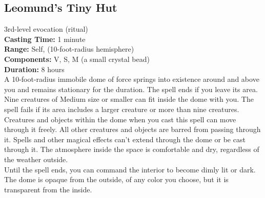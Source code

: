 \documentclass[11pt, A4paper, english]{article}
\begin{document}
		\subsection{Leomund’s Tiny Hut}
3rd-level evocation (ritual) \\
\textbf{Casting Time:} 1 minute \\
\textbf{Range:} Self, (10-foot-radius hemisphere) \\
\textbf{Components:} V, S, M (a small crystal bead) \\
\textbf{Duration:} 8 hours \\
A 10-foot-radius immobile dome of force springs into existence around and above you and remains stationary for the duration. The spell ends if you leave its area. \\
Nine creatures of Medium size or smaller can fit inside the dome with you. The spell fails if its area includes a larger creature or more than nine creatures. Creatures and objects within the dome when you cast this spell can move through it freely. All other creatures and objects are barred from passing through it. Spells and other magical effects can’t extend through the dome or be cast through it. The atmosphere inside the space is comfortable and dry, regardless of the weather outside. \\
Until the spell ends, you can command the interior to become dimly lit or dark. The dome is opaque from the outside, of any color you choose, but it is transparent from the inside.
\end{document}
